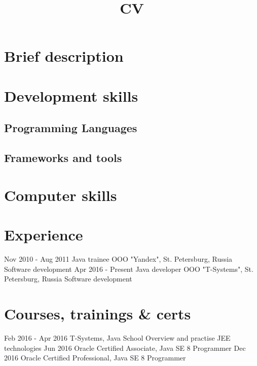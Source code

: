 \documentclass[11pt,a4paper,russian]{moderncv}
\title{CV}
\begin{document}
\maketitle

\section{Brief description}
  
\section{Development skills}

\subsection{Programming Languages}

\subsection{Frameworks and tools}

\section{Computer skills}
  
\section{Experience}
\cventry
    {Nov 2010 - Aug 2011}
    {Java trainee}
    {OOO "Yandex", St. Petersburg, Russia}{}{}
    {Software development}
\cventry
    {Apr 2016 - Present}
    {Java developer}
    {OOO "T-Systems", St. Petersburg, Russia}{}{}
    {Software development} 
  
\section{Courses, trainings \& certs}    
\cvline
    {Feb 2016 - Apr 2016}
    {T-Systems, Java School \newline
    Overview and practise JEE technologies}
\cvline
    {Jun 2016}
    {Oracle Certified Associate, Java SE 8 Programmer}
\cvline
    {Dec 2016}
    {Oracle Certified Professional, Java SE 8 Programmer}
    
\end{document}
